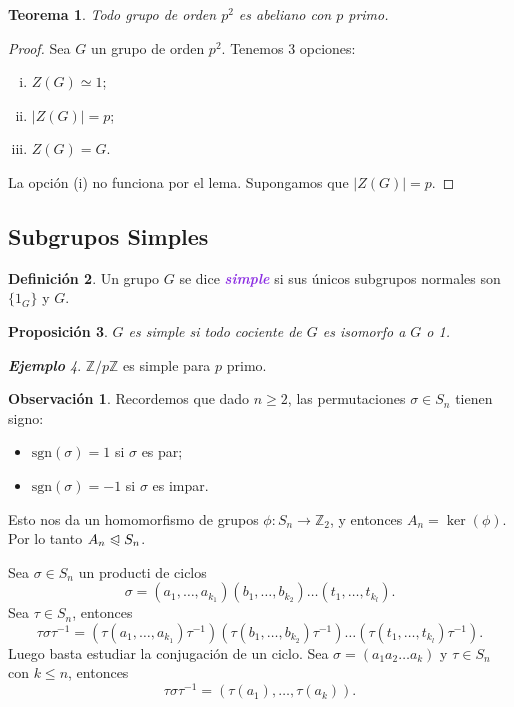 \documentclass{article}
\newtheorem{theorem}{Teorema}[subsection]
\newtheorem{proposition}[theorem]{Proposición}
\theoremstyle{definition}
\newtheorem{definition}[theorem]{Definición}
\newtheorem*{obs}{Observación}
\theoremstyle{remark}
\newtheorem{example}[theorem]{\textbf{Ejemplo}}
\numberwithin{equation}{section}
\newcommand{\Z}{\mathbb{Z}}
\newcommand{\normal}{\trianglelefteqslant}
\newcommand{\sgn}{\mathrm{sgn}}
\newcommand{\abs}[1]{\left| #1 \right|}
\newcommand{\zmz}[1]{\Z/ #1 \Z}
\newcommand{\wea}[1]{\textcolor{BlueViolet}{\textbf{\emph{#1}}}}
\begin{document}
\begin{theorem}
  Todo grupo de orden $p^2$ es abeliano con $p$ primo.
\end{theorem}
\begin{proof}
  Sea $G$ un grupo de orden $p^2$. Tenemos 3 opciones:
  \begin{enumerate}[(i)]
    \item $Z(G) \simeq 1$;
    \item $\abs{Z(G)} = p$;
    \item $Z(G) = G$.
  \end{enumerate}
  La opción (i) no funciona por el lema. Supongamos que $\abs{Z(G)} = p$.
\end{proof}

\newpage
\subsection{Subgrupos Simples}

\begin{definition}
  Un grupo $G$ se dice \wea{simple} si sus únicos subgrupos normales son $\{1_G\}$ y $G$.
\end{definition}

\begin{proposition}
  $G$ es simple si todo cociente de $G$ es isomorfo a $G$ o 1.
\end{proposition}

\begin{example}
  $\zmz p$ es simple para $p$ primo.
\end{example}

\begin{obs}
  Recordemos que dado $n \geq 2$, las permutaciones $\sigma \in S_n$ tienen signo:
  \begin{itemize}
    \item $\sgn(\sigma) = 1$ si $\sigma$ es par;
    \item $\sgn(\sigma) = -1$ si $\sigma$ es impar.
  \end{itemize}
  Esto nos da un homomorfismo de grupos $\phi \colon S_n \to \Z_2$, y entonces $A_n = \ker(\phi)$. Por lo tanto $A_n \normal S_n$.

  Sea $\sigma \in S_n$ un producti de ciclos
  \[\sigma = (a_1,\dots,a_{k_1})(b_1,\dots,b_{k_2})\dots(t_1,\dots,t_{k_l}).\]
  Sea $\tau \in S_n$, entonces
  \[\tau\sigma\tau^{-1} = (\tau(a_1,\dots,a_{k_1})\tau^{-1})(\tau(b_1,\dots,b_{k_2})\tau^{-1}) \dots (\tau(t_1,\dots,t_{k_l})\tau^{-1}).\]
  Luego basta estudiar la conjugación de un ciclo. Sea $\sigma = (a_1 a_2 \dots a_k)$ y $\tau \in S_n$ con $k \leq n$, entonces
  \[\tau\sigma\tau^{-1} = (\tau(a_1), \dots, \tau(a_k)).\]
\end{obs}
\end{document}
